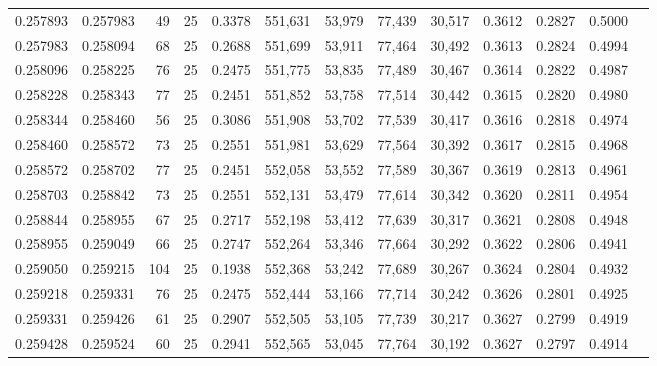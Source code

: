 \begin{tabular}{rrrrrrrrrrrrr}
0.257893 & 0.257983 &    49 &  25 &                                     0.3378 & 551,631 &  53,979 &  77,439 &  30,517 & 0.3612 & 0.2827 & 0.5000 \\
0.257983 & 0.258094 &    68 &  25 &                                     0.2688 & 551,699 &  53,911 &  77,464 &  30,492 & 0.3613 & 0.2824 & 0.4994 \\
0.258096 & 0.258225 &    76 &  25 &                                     0.2475 & 551,775 &  53,835 &  77,489 &  30,467 & 0.3614 & 0.2822 & 0.4987 \\
0.258228 & 0.258343 &    77 &  25 &                                     0.2451 & 551,852 &  53,758 &  77,514 &  30,442 & 0.3615 & 0.2820 & 0.4980 \\
0.258344 & 0.258460 &    56 &  25 &                                     0.3086 & 551,908 &  53,702 &  77,539 &  30,417 & 0.3616 & 0.2818 & 0.4974 \\
0.258460 & 0.258572 &    73 &  25 &                                     0.2551 & 551,981 &  53,629 &  77,564 &  30,392 & 0.3617 & 0.2815 & 0.4968 \\
0.258572 & 0.258702 &    77 &  25 &                                     0.2451 & 552,058 &  53,552 &  77,589 &  30,367 & 0.3619 & 0.2813 & 0.4961 \\
0.258703 & 0.258842 &    73 &  25 &                                     0.2551 & 552,131 &  53,479 &  77,614 &  30,342 & 0.3620 & 0.2811 & 0.4954 \\
0.258844 & 0.258955 &    67 &  25 &                                     0.2717 & 552,198 &  53,412 &  77,639 &  30,317 & 0.3621 & 0.2808 & 0.4948 \\
0.258955 & 0.259049 &    66 &  25 &                                     0.2747 & 552,264 &  53,346 &  77,664 &  30,292 & 0.3622 & 0.2806 & 0.4941 \\
0.259050 & 0.259215 &   104 &  25 &                                     0.1938 & 552,368 &  53,242 &  77,689 &  30,267 & 0.3624 & 0.2804 & 0.4932 \\
0.259218 & 0.259331 &    76 &  25 &                                     0.2475 & 552,444 &  53,166 &  77,714 &  30,242 & 0.3626 & 0.2801 & 0.4925 \\
0.259331 & 0.259426 &    61 &  25 &                                     0.2907 & 552,505 &  53,105 &  77,739 &  30,217 & 0.3627 & 0.2799 & 0.4919 \\
0.259428 & 0.259524 &    60 &  25 &                                     0.2941 & 552,565 &  53,045 &  77,764 &  30,192 & 0.3627 & 0.2797 & 0.4914 \\

\end{tabular}
